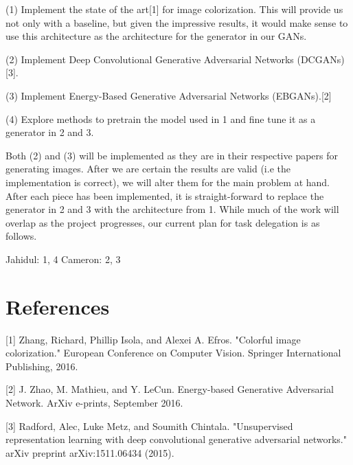 \documentclass{article}
\begin{document}
\vspace{2pt}
(1) Implement the state of the art[1] for image colorization. This will provide
\indent us not only with a baseline, but given the impressive results, it would make
\indent sense to use this architecture as the architecture for the generator in our
\indent GANs.

\vspace{3pt}
(2) Implement Deep Convolutional Generative Adversarial Networks \newline
\indent (DCGANs)[3]. 

\vspace{3pt}
(3) Implement Energy-Based Generative Adversarial Networks (EBGANs).[2]

\vspace{3pt}
(4) Explore methods to pretrain the model used in 1 and fine tune it as a
\indent generator in 2 and 3.

\vspace{4pt}

\noindent Both (2) and (3) will be implemented as they are in their respective papers for generating
images. After we are certain the results are valid (i.e the implementation is correct), we will alter
them for the main problem at hand. After each piece has been implemented, it is straight-forward to
replace the generator in 2 and 3 with the architecture from 1. While much of the work will overlap as the
project progresses, our current plan for task delegation is as follows. \newline

\noindent Jahidul: 1, 4 \newline
\noindent Cameron: 2, 3



\section{References}
[1] Zhang, Richard, Phillip Isola, and Alexei A. Efros. "Colorful image colorization." 
European Conference on Computer Vision. Springer International Publishing, 2016.

[2] J. Zhao, M. Mathieu, and Y. LeCun.  Energy-based Generative Adversarial 
Network. ArXiv e-prints, September 2016.\newline

[3] Radford, Alec, Luke Metz, and Soumith Chintala. "Unsupervised representation learning with deep
convolutional generative adversarial networks." arXiv preprint arXiv:1511.06434 (2015).
\end{document}

